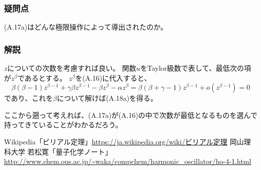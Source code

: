\documentclass{jsarticle}
\begin{document}
\subsubsection*{疑問点}
(A.17a)はどんな極限操作によって導出されたのか。

\subsubsection*{解説}

$z$についての次数を考慮すれば良い。
関数$u$をTaylor級数で表して、最低次の項が$z^\beta$であるとする。
$z^\beta$を(A.16)に代入すると、
\begin{equation*}
    \beta(\beta-1)z^{\beta-1}
    +
    \gamma\beta z^{\beta-1}
    -
    \beta z^\beta
    -\alpha z^\beta
    =
    \beta(\beta+\gamma-1)z^{\beta-1}
    +
    o(z^{\beta-1})
    =
    0
\end{equation*}
であり、これを$\beta$について解けば(A.18a)を得る。

ここから遡って考えれば、(A.17a)が(A.16)の中で次数が最低となるものを選んで持ってきていることがわかるだろう。


\begin{thebibliography}
     Wikipedia「ビリアル定理」\url{https://ja.wikipedia.org/wiki/ビリアル定理}
     岡山理科大学 若松寛「量子化学ノート」\url{http://www.chem.ous.ac.jp/~waka/compchem/harmonic_oscillator/ho-4-1.html}
\end{thebibliography}
\end{document}
